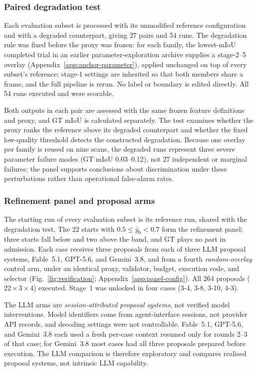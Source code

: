 \documentclass[a4paper,fleqn]{cas-dc}
\begin{document}
\subsubsection{Paired degradation test}
\label{sec:stress-test}

Each evaluation subset is processed with its unmodified reference configuration and with a degraded counterpart, giving 27 pairs and 54 runs. The degradation rule was fixed before the proxy was frozen: for each family, the lowest-mIoU completed trial in an earlier parameter-exploration archive supplies a stage-2--5 overlay (Appendix~\ref{app:anchor-parameter}), applied unchanged on top of every subset's reference; stage-1 settings are inherited so that both members share a frame, and the full pipeline is rerun. No label or boundary is edited directly. All 54 runs executed and were scorable.

Both outputs in each pair are assessed with the same frozen feature definitions and proxy, and GT mIoU is calculated separately. The test examines whether the proxy ranks the reference above its degraded counterpart and whether the fixed low-quality threshold detects the constructed degradation. Because one overlay per family is reused on nine scans, the degraded runs represent three severe parameter failure modes (GT mIoU 0.03--0.12), not 27 independent or marginal failures; the panel supports conclusions about discrimination under these perturbations rather than operational false-alarm rates.

\subsubsection{Refinement panel and proposal arms}
\label{sec:poc-protocol}

The starting run of every evaluation subset is its reference run, shared with the degradation test. The 22 starts with $0.5\le\hat y_0<0.7$ form the refinement panel; three starts fall below and two above the band, and GT plays no part in admission. Each case receives three proposals from each of three LLM proposal systems, Fable~5.1, GPT-5.6, and Gemini~3.8, and from a fourth \emph{random-overlay} control arm, under an identical proxy, validator, budget, execution code, and selector (Fig.~\ref{fig:verification}; Appendix~\ref{app:panel-config}). All $264$ proposals ($22\times3\times4$) executed. Stage~1 was unlocked in four cases (3-4, 3-8, 3-10, 4-3).

The LLM arms are \emph{session-attributed proposal systems}, not verified model interventions. Model identifiers come from agent-interface sessions, not provider API records, and decoding settings were not controllable. Fable~5.1, GPT-5.6, and Gemini~3.8 each used a fresh per-case context resumed only for rounds 2--3 of that case; for Gemini~3.8 most cases had all three proposals prepared before execution. The LLM comparison is therefore exploratory and compares realised proposal systems, not intrinsic LLM capability.
\end{document}
